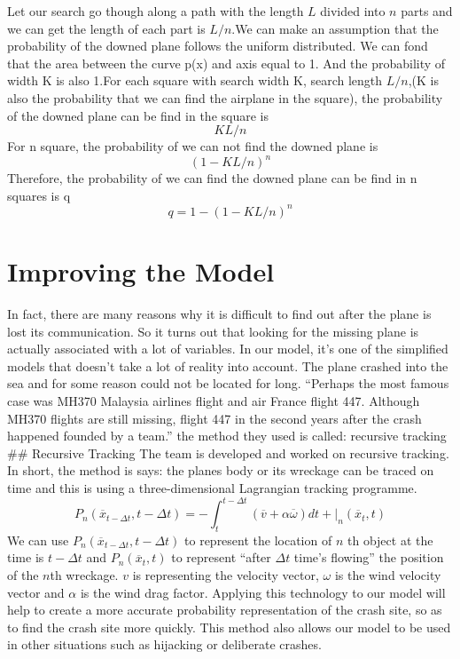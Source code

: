 \documentclass[11pt]{article}
\begin{document}
Let our search go though along a path with the length $L$ divided into $n$ parts and we can get the length of each part is $L/n$.We can make an assumption that the probability of the downed plane follows the uniform distributed. We can fond that the area between the curve p(x) and axis equal to 1. And the probability of width K is also 1.For each square with search width K, search length $L/n$,(K is also the probability that we can find the airplane in the square), the probability of the downed plane can be find in the square is 
\[KL/n\]
For n square, the probability of we can not find the downed plane is
\[
(1-KL/n)^n
\]
Therefore, the probability of we can find the downed plane can be find in n squares is q
\[
q=1-(1-KL/n)^n
\]



    \hypertarget{improving-the-model}{%
\section{Improving the Model}\label{inproving-the-model}}

In fact, there are many reasons why it is difficult to find out after
the plane is lost its communication. So it turns out that looking for
the missing plane is actually associated with a lot of variables. In our
model, it's one of the simplified models that doesn't take a lot of
reality into account. The plane crashed into the sea and for some reason
could not be located for long. “Perhaps the most famous case was MH370
Malaysia airlines flight and air France flight 447. Although MH370
flights are still missing, flight 447 in the second years after the
crash happened founded by a team.”\cite{chen2012fvcom} \cite{} the method they used is called:
recursive tracking \#\# Recursive Tracking The team is developed and
worked on recursive tracking. In short, the method is says: the planes
body or its wreckage can be traced on time and this is using a
three-dimensional Lagrangian tracking programme.
\[P_n(\overline x_{t-\Delta t},t-\Delta t) = -\int^{t-\Delta t}_t (\overline v + \alpha \overline \omega)dt + |_n(\overline x_t,t)\]
We can use \(P_n(\overline x_{t-\Delta t}, t-\Delta t)\) to represent
the location of \(n\) th object at the time is \(t-\Delta t\) and
\(P_n(\overline x_t, t)\) to represent ``after \(\Delta t\) time's
flowing'' the position of the \(n\)th wreckage. \(v\) is representing
the velocity vector, \(\omega\) is the wind velocity vector and
\(\alpha\) is the wind drag factor. Applying this technology to our
model will help to create a more accurate probability representation of
the crash site, so as to find the crash site more quickly. This method
also allows our model to be used in other situations such as hijacking
or deliberate crashes.
\end{document}
